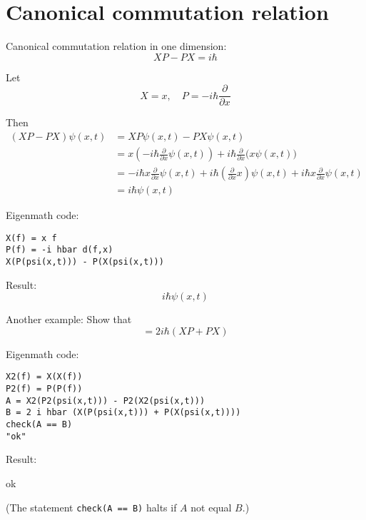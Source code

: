 

\section*{Canonical commutation relation}

\iffalse
Fedak  and Prentis write
\begin{quote}
The theory of Fourier and the correspondence principle of Bohr
played a vital role in Heisenberg's development of quantum mechanics.
\end{quote}

Aitchison, MacManus, and Snyder write
\begin{quote}
This `difficulty’ clearly unsettled Heisenberg: but it very
quickly became clear that the non-commutativity (in general) of kinematical
quantities in quantum theory was the really essential new technical idea in the
paper.
\end{quote}
\fi

Canonical commutation relation in one dimension:
\begin{equation*}
XP-PX=i\hbar
\end{equation*}

Let
\begin{equation*}
X=x,\quad P=-i\hbar\frac{\partial}{\partial x}
\end{equation*}

Then
\begin{align*}
(XP-PX)\psi(x,t)&=XP\psi(x,t)-PX\psi(x,t)
\\
&=x\left(-i\hbar\frac{\partial}{\partial x}\psi(x,t)\right)
+i\hbar\frac{\partial}{\partial x}\bigl(x\psi(x,t)\bigr)
\\
&=-i\hbar x\frac{\partial}{\partial x}\psi(x,t)
+i\hbar\left(\frac{\partial}{\partial x}x\right)\psi(x,t)
+i\hbar x\frac{\partial}{\partial x}\psi(x,t)
\\
&=i\hbar\psi(x,t)
\end{align*}

Eigenmath code:
\begin{verbatim}
X(f) = x f
P(f) = -i hbar d(f,x)
X(P(psi(x,t))) - P(X(psi(x,t)))
\end{verbatim}

Result:
\begin{equation*}
i\hbar\psi(x,t)
\end{equation*}

\bigskip
Another example: Show that
\begin{equation*}
[X^2,P^2]=2i\hbar(XP+PX)
\end{equation*}

Eigenmath code:
\begin{verbatim}
X2(f) = X(X(f))
P2(f) = P(P(f))
A = X2(P2(psi(x,t))) - P2(X2(psi(x,t)))
B = 2 i hbar (X(P(psi(x,t))) + P(X(psi(x,t))))
check(A == B)
"ok"
\end{verbatim}

Result:

ok

\bigskip
(The statement {\tt check(A == B)} halts if $A$ not equal $B$.)

